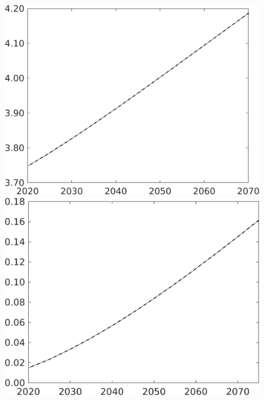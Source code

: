 \documentclass[12pt]{article}
\begin{document}
\begin{figure}[h!!]
\begin{minipage}[]{0.32\textwidth}
	\end{minipage}	
	\begin{minipage}[]{0.32\textwidth}
		\includegraphics[width=1\textwidth]{../../codding_model/own_basedOnFried/optimalPol_010922_revision/figures/all_13Sept22/CompTaul_LFBAU_Reg0_gAf_spillover0_nsk1_xgr0_knspil0_sep1_countec0_GovRev0_etaa0.79_lgd0.png}
	\end{minipage}	
	\begin{minipage}[]{0.32\textwidth}
		\includegraphics[width=1\textwidth]{../../codding_model/own_basedOnFried/optimalPol_010922_revision/figures/all_13Sept22/CompTaul_Equlab_LFBAU_Reg0_AgAf_spillover0_nsk1_xgr0_knspil0_sep1_countec0_GovRev0_etaa0.79_lgd0.png}

\end{minipage}
\end{figure}
\end{document}

